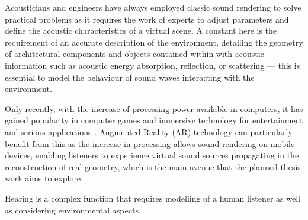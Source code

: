 Acousticians and engineers have always employed classic sound rendering to solve practical problems as it requires the work of experts to adjust parameters and define the acoustic characteristics of a virtual scene. A constant here is the requirement of an accurate description of the environment, detailing the geometry of architectural components and objects contained within with acoustic information such as acoustic energy absorption, reflection, or scattering --- this is essential to model the behaviour of sound waves interacting with the environment. \par
Only recently, with the increase of processing power available in computers, it has gained popularity in computer games and immersive technology for entertainment and serious applications \citep{zhang18}. Augmented Reality (AR) technology can particularly benefit from this as the increase in processing allows sound rendering on mobile devices, enabling listeners to experience virtual sound sources propagating in the reconstruction of real geometry, which is the main avenue that the planned thesis work aims to explore. \par

Hearing is a complex function that requires modelling of a human listener as well as considering environmental aspects.

